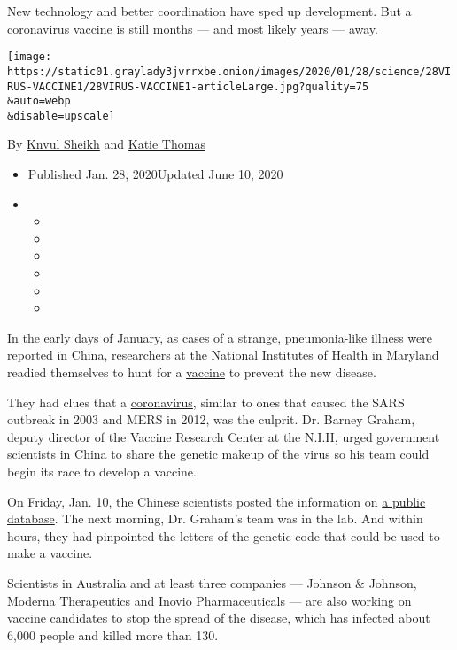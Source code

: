 New technology and better coordination have sped up development. But a
coronavirus vaccine is still months --- and most likely years --- away.

\texttt{[image: https://static01.graylady3jvrrxbe.onion/images/2020/01/28/science/28VIRUS-VACCINE1/28VIRUS-VACCINE1-articleLarge.jpg?quality=75\\\&auto=webp\\\&disable=upscale]}

By \href{https://www.nytimes3xbfgragh.onion/by/knvul-sheikh}{Knvul
Sheikh} and
\href{https://www.nytimes3xbfgragh.onion/by/katie-thomas}{Katie Thomas}

\begin{itemize}
\item
  Published Jan. 28, 2020Updated June 10, 2020
\item
  \begin{itemize}
  \item
  \item
  \item
  \item
  \item
  \item
  \end{itemize}
\end{itemize}

In the early days of January, as cases of a strange, pneumonia-like
illness were reported in China, researchers at the National Institutes
of Health in Maryland readied themselves to hunt for a
\href{https://www.nytimes3xbfgragh.onion/2020/04/27/world/europe/coronavirus-vaccine-update-oxford.html}{vaccine}
to prevent the new disease.

They had clues that a
\href{https://www.nytimes3xbfgragh.onion/2020/04/27/world/europe/coronavirus-vaccine-update-oxford.html}{coronavirus},
similar to ones that caused the SARS outbreak in 2003 and MERS in 2012,
was the culprit. Dr. Barney Graham, deputy director of the Vaccine
Research Center at the N.I.H, urged government scientists in China to
share the genetic makeup of the virus so his team could begin its race
to develop a vaccine.

On Friday, Jan. 10, the Chinese scientists posted the information on
\href{https://www.ncbi.nlm.nih.gov/nuccore/MN908947}{a public database}.
The next morning, Dr. Graham's team was in the lab. And within hours,
they had pinpointed the letters of the genetic code that could be used
to make a vaccine.

Scientists in Australia and at least three companies --- Johnson \&
Johnson,
\href{https://www.nytimes3xbfgragh.onion/2020/05/18/health/coronavirus-vaccine-moderna.html}{Moderna
Therapeutics} and Inovio Pharmaceuticals --- are also working on vaccine
candidates to stop the spread of the disease, which has infected about
6,000 people and killed more than 130.

